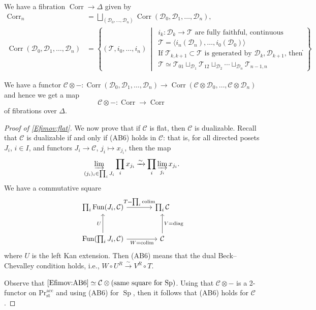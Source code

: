 \documentclass[draft]{amsart}
\newcommand{\set}[2]{\left\{#1\,\middle|\,#2\right\}}
\newcommand{\cat}[1]{\mathcal{#1}}
\newcommand{\isoto}{\mathbin{\xrightarrow{\sim}}}
\renewcommand{\Pr}{\mathrm{Pr}}
\newcommand{\blank}{-} %
\DeclareMathOperator{\Sp}{Sp}
\DeclareMathOperator{\Fun}{Fun}
\DeclareMathOperator{\Corr}{Corr}
\DeclareMathOperator*{\colim}{colim}
\theoremstyle{definition}
\begin{document}
We have a fibration $\Corr \to \Delta$ given by
\begin{align*}
\Corr_n &= \bigsqcup_{(\cat D_0,\dotsc, \cat D_n)} \Corr(\cat D_0, \cat D_1,\dotsc,\cat D_n), \\
\Corr(\cat D_0,\cat D_1,\dotsc,\cat D_n) &= \set{(\cat T, i_0,\dotsc,i_n)}{\begin{array}{l}
\text{$i_k\colon \cat D_k\to \cat T$ are fully faithful, continuous} \\
\text{$\cat T = \langle i_n(\cat D_n), \dotsc, i_0(\cat D_0)\rangle$} \\
\text{If $\cat T_{k,k+1} \subset \cat T$ is generated by $\cat D_k, \cat D_{k+1}$, then} \\
\cat T \simeq \cat T_{01} \sqcup_{\cat D_1} \cat T_{12} \sqcup_{\cat D_2} \dotsb \sqcup_{\cat D_n} \cat T_{n-1,n}
\end{array}}.
\end{align*}

We have a functor $\cat C\otimes \blank \colon \Corr(\cat D_0,\cat D_1,\dotsc, \cat D_n) \to \Corr(\cat C\otimes \cat D_0,\dotsc, \cat C\otimes \cat D_n)$ and hence we get a map
\[
\cat C\otimes\blank \colon \Corr \to \Corr
\]
of fibrations over $\Delta$.

\begin{proof}[Proof of \cref{Efimov:flat}]
We now prove that if $\cat C$ is flat, then $\cat C$ is dualizable. Recall that $\cat C$ is dualizable if and only if (AB6) holds in $\cat C$: that is, for all directed posets $J_i$, $i\in I$, and functors $J_i \to \cat C$, $j_i\mapsto x_{j_i}$, then the map
\[
\varinjlim\limits_{(j_i)_i \in \prod_i J_i} \prod_i x_{j_i} \isoto \prod_i \varinjlim\limits_{j_i} x_{j_i}.
\]
We have a commutative square
\begin{equation}\label{Efimov:AB6}
\begin{tikzcd}[sep = large]
\prod_i \Fun(J_i, \cat C) \ar[r,"T = \prod_i \colim"] & \prod_i \cat C \\
\Fun(\prod_i J_i, \cat C) \ar[r, "W = \colim"'] \ar[u, "U"] & \cat C \ar[u, "V = \text{diag}"']
\end{tikzcd}
\end{equation}
where $U$ is the left Kan extension. Then (AB6) means that the dual Beck--Chevalley condition holds, i.e., $W\circ U^R \isoto V^R\circ T$.

Observe that $\eqref{Efimov:AB6} \simeq \cat C\otimes (\text{same square for $\Sp$})$. Using that $\cat C\otimes \blank$ is a 2-functor on $\Pr^{\mathrm{acc}}_{\mathrm{st}}$ and using (AB6) for $\Sp$, then it follows that (AB6) holds for $\cat C$.
\end{proof}
\end{document}
